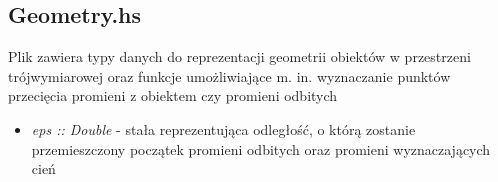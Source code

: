 \documentclass[11pt,a4paper]{article}
\begin{document}
\subsection{Geometry.hs}
Plik zawiera typy danych do reprezentacji geometrii obiektów w przestrzeni trójwymiarowej oraz funkcje umożliwiające m. in. wyznaczanie punktów przecięcia promieni z obiektem czy promieni odbitych
\begin{itemize}
\item\textit{eps :: Double} - stała reprezentująca odległość, o którą zostanie przemieszczony początek promieni odbitych oraz promieni wyznaczających cień
\end{itemize}
\end{document}
